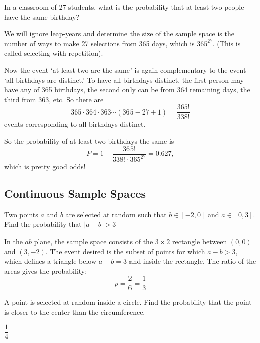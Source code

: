 \documentclass[../main.tex]{subfiles}
\begin{document}
\begin{example}
	In a classroom of 27 students, what is the probability
	that at least two people have the same birthday?
\end{example}

\begin{solution}
	We will ignore leap-years and determine the size of the sample
	space is the number of ways to make 27 selections from 365 days, which is $365^{27}$. (This is called selecting with repetition).
	
	Now the event `at least two are the same' is again complementary to the event `all birthdays are distinct.' To have all birthdays distinct, the first person may have any of 365 birthdays,
	the second only can be from 364 remaining days, the third
	from 363, etc. So there are 
	$$ 365 \cdot 364 \cdot 363 \cdots (365-27+1) = \dfrac{365!}{338!}
	$$ events corresponding to all birthdays distinct.
	
	So the probability of at least two birthdays the same is
	$$ P = 1 - \dfrac{365!}{338! \cdot 365^{27}} = 0.627, $$
	which is pretty good odds!
\end{solution}

\subsection{Continuous Sample Spaces}
\begin{example}
	Two points $a$ and $b$ are selected at random such that
	$b \in [-2,0]$ and $a \in [0,3]$. Find the
	probability that $|a-b| > 3$
\end{example}

\begin{solution}
	In the $ab$ plane, the sample space consists of the
	$3 \times 2$ rectangle between $(0,0)$ and $(3,-2)$.
	The event desired is the subset of points 
	for which $a-b>3$, which defines a triangle below $a-b=3$
	and inside the rectangle. The ratio of the areas gives the
	probability:  
	$$p = \dfrac{2}{6} = \dfrac{1}{3}$$
\end{solution}

\begin{example}
	A point is selected at random inside a circle. Find the probability that the point is closer to the center
	than the circumference.
\end{example}

\begin{solution}[Answer]
	$\dfrac14$
\end{solution}
\end{document}
